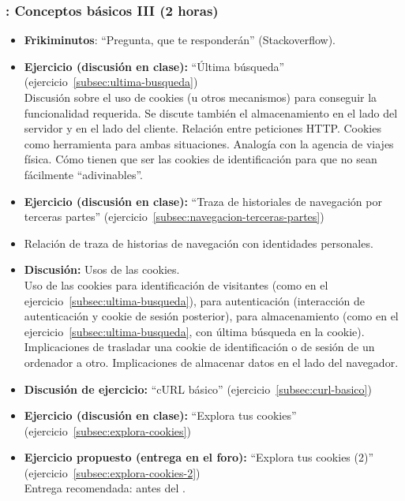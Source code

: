 \documentclass[a4paper,12pt]{article}
\begin{document}
\subsubsection{\martesC: Conceptos básicos III (2 horas)}
\label{cal:martesC}

\begin{itemize}
\item \textbf{Frikiminutos}: ``Pregunta, que te responderán'' (Stackoverflow).
\item \textbf{Ejercicio (discusión en clase):} ``Última búsqueda'' (ejercicio~\ref{subsec:ultima-busqueda}) \\
  Discusión sobre el uso de cookies (u otros mecanismos) para conseguir la funcionalidad requerida. Se discute también el almacenamiento en el lado del servidor y en el lado del cliente. Relación entre peticiones HTTP. Cookies como herramienta para ambas situaciones. Analogía con la agencia de viajes física. Cómo tienen que ser las cookies de identificación para que no sean fácilmente ``adivinables''.
  \item \textbf{Ejercicio (discusión en clase):} ``Traza de historiales de navegación por terceras partes'' (ejercicio~\ref{subsec:navegacion-terceras-partes})
\item Relación de traza de historias de navegación con identidades personales.
\item \textbf{Discusión:} Usos de las cookies. \\
  Uso de las cookies para identificación de visitantes (como en el ejercicio~\ref{subsec:ultima-busqueda}), para autenticación (interacción de autenticación y cookie de sesión posterior), para almacenamiento (como en el ejercicio~\ref{subsec:ultima-busqueda}, con última búsqueda en la cookie). Implicaciones de trasladar una cookie de identificación o de sesión de un ordenador a otro. Implicaciones de almacenar datos en el lado del navegador.
\item \textbf{Discusión de ejercicio:} ``cURL básico'' (ejercicio~\ref{subsec:curl-basico})
\item \textbf{Ejercicio (discusión en clase):} ``Explora tus cookies'' (ejercicio~\ref{subsec:explora-cookies}) 
\item \textbf{Ejercicio propuesto (entrega en el foro):} ``Explora tus cookies (2)'' (ejercicio~\ref{subsec:explora-cookies-2}) \\
  Entrega recomendada: antes del \martesD.
\end{itemize}
\end{document}
